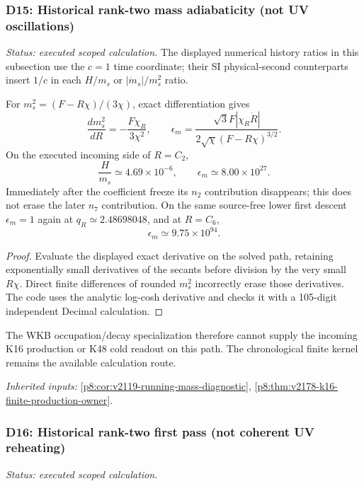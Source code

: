 \documentclass[12pt,a4paper]{article}
\begin{document}
\subsubsection{D15: Historical rank-two mass adiabaticity (not UV oscillations)}
\label{p8:sec:v2201-derived-d15}
\noindent\textit{Status: executed scoped calculation.}
The displayed numerical history ratios in this subsection use the
\(c=1\) time coordinate; their SI physical-second counterparts
insert \(1/c\) in each \(H/m_s\) or \(|\dot m_s|/m_s^2\) ratio.

For $m_s^2=(F-R\chi)/(3\chi)$, exact differentiation gives
\[
 \frac{d m_s^2}{dR}=-\frac{F\chi_R}{3\chi^2},\qquad
 \epsilon_m=\frac{\sqrt3F|\chi_R\dot R|}
 {2\sqrt\chi(F-R\chi)^{3/2}}.
\]
On the executed incoming side of $R=C_2$,
\[
 \frac{H}{m_s}\simeq4.69\times10^{-6},\qquad
 \epsilon_m\simeq8.00\times10^{27}.
\]
Immediately after the coefficient freeze its $n_2$ contribution disappears;
this does not erase the later $n_7$ contribution. On the same source-free
lower first descent $\epsilon_m=1$ again at
$q_R\simeq2.48698048$, and at $R=C_6$,
\[
 \boxed{\epsilon_m\simeq9.75\times10^{94}.}
\]
\begin{proof}
Evaluate the displayed exact derivative on the solved path,
retaining exponentially small derivatives of the secants before division
by the very small $R\chi$. Direct finite differences of rounded
$m_s^2$ incorrectly erase those derivatives. The code uses the analytic
log-cosh derivative and checks it with a 105-digit independent Decimal
calculation.
\end{proof}
The WKB occupation/decay specialization therefore cannot supply the incoming
K16 production or K48 cold readout on this path. The chronological finite
kernel remains the available calculation route.
\par\noindent\textit{Inherited inputs:} \ref{p8:cor:v2119-running-mass-diagnostic}, \ref{p8:thm:v2178-k16-finite-production-owner}.

\subsubsection{D16: Historical rank-two first pass (not coherent UV reheating)}
\label{p8:sec:v2201-derived-d16}
\noindent\textit{Status: executed scoped calculation.}
\end{document}
